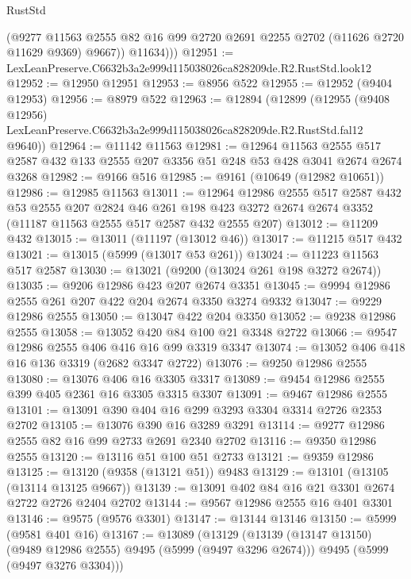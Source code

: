 \begin{lexlean}{RustStd}
\begin{coremodule}
            (@9277
              @11563
              @2555
              @82
              @16
              @99
              @2720
              @2691
              @2255
              @2702
              (@11626 @2720 @11629 @9369)
              @9667))
          @11634)))
@12951 := LexLeanPreserve.C6632b3a2e999d115038026ca828209de.R2.RustStd.look12
@12952 := @12950 @12951
@12953 := @8956 @522
@12955 := @12952 (@9404 @12953)
@12956 := @8979 @522
@12963 := @12894
    (@12899
      (@12955
        (@9408 @12956)
        LexLeanPreserve.C6632b3a2e999d115038026ca828209de.R2.RustStd.fal12
        @9640))
@12964 := @11142 @11563
@12981 := @12964
    @11563
    @2555
    @517
    @2587
    @432
    @133
    @2555
    @207
    @3356
    @51
    @248
    @53
    @428
    @3041
    @2674
    @2674
    @3268
@12982 := @9166 @516
@12985 := @9161 (@10649 (@12982 @10651))
@12986 := @12985 @11563
@13011 := @12964
    @12986
    @2555
    @517
    @2587
    @432
    @53
    @2555
    @207
    @2824
    @46
    @261
    @198
    @423
    @3272
    @2674
    @2674
    @3352
    (@11187 @11563 @2555 @517 @2587 @432 @2555 @207)
@13012 := @11209 @432
@13015 := @13011 (@11197 (@13012 @46))
@13017 := @11215 @517 @432
@13021 := @13015 (@5999 (@13017 @53 @261))
@13024 := @11223 @11563 @517 @2587
@13030 := @13021 (@9200 (@13024 @261 @198 @3272 @2674))
@13035 := @9206 @12986 @423 @207 @2674 @3351
@13045 := @9994 @12986 @2555 @261 @207 @422 @204 @2674 @3350 @3274 @9332
@13047 := @9229 @12986 @2555
@13050 := @13047 @422 @204 @3350
@13052 := @9238 @12986 @2555
@13058 := @13052 @420 @84 @100 @21 @3348 @2722
@13066 := @9547 @12986 @2555 @406 @416 @16 @99 @3319 @3347
@13074 := @13052 @406 @418 @16 @136 @3319 (@2682 @3347 @2722)
@13076 := @9250 @12986 @2555
@13080 := @13076 @406 @16 @3305 @3317
@13089 := @9454 @12986 @2555 @399 @405 @2361 @16 @3305 @3315 @3307
@13091 := @9467 @12986 @2555
@13101 := @13091 @390 @404 @16 @299 @3293 @3304 @3314 @2726 @2353 @2702
@13105 := @13076 @390 @16 @3289 @3291
@13114 := @9277 @12986 @2555 @82 @16 @99 @2733 @2691 @2340 @2702
@13116 := @9350 @12986 @2555
@13120 := @13116 @51 @100 @51 @2733
@13121 := @9359 @12986
@13125 := @13120 (@9358 (@13121 @51)) @9483
@13129 := @13101 (@13105 (@13114 @13125 @9667))
@13139 := @13091 @402 @84 @16 @21 @3301 @2674 @2722 @2726 @2404 @2702
@13144 := @9567 @12986 @2555 @16 @401 @3301
@13146 := @9575 (@9576 @3301)
@13147 := @13144 @13146
@13150 := @5999 (@9581 @401 @16)
@13167 := @13089
    (@13129
      (@13139 (@13147 @13150) (@9489 @12986 @2555) @9495 (@5999 (@9497 @3296 @2674)))
      @9495
      (@5999 (@9497 @3276 @3304)))

\end{coremodule}
\end{lexlean}
